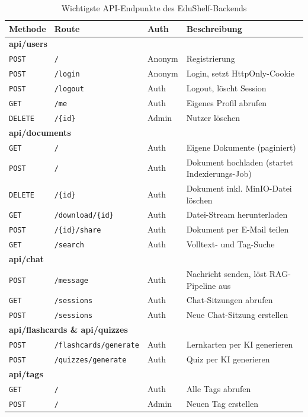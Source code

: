 \begin{table}[H]
\centering
\begin{tabular}{|l|p{5.5cm}|l|p{4cm}|}
\hline
\textbf{Methode} & \textbf{Route} & \textbf{Auth} & \textbf{Beschreibung} \\
\hline
\multicolumn{4}{|l|}{\textbf{api/users}} \\
\hline
\texttt{POST}   & \texttt{/}              & Anonym & Registrierung \\
\texttt{POST}   & \texttt{/login}         & Anonym & Login, setzt HttpOnly-Cookie \\
\texttt{POST}   & \texttt{/logout}        & Auth   & Logout, l\"oscht Session \\
\texttt{GET}    & \texttt{/me}            & Auth   & Eigenes Profil abrufen \\
\texttt{DELETE} & \texttt{/\{id\}}        & Admin  & Nutzer l\"oschen \\
\hline
\multicolumn{4}{|l|}{\textbf{api/documents}} \\
\hline
\texttt{GET}    & \texttt{/}              & Auth   & Eigene Dokumente (paginiert) \\
\texttt{POST}   & \texttt{/}              & Auth   & Dokument hochladen (startet Indexierungs-Job) \\
\texttt{DELETE} & \texttt{/\{id\}}        & Auth   & Dokument inkl. MinIO-Datei l\"oschen \\
\texttt{GET}    & \texttt{/download/\{id\}} & Auth & Datei-Stream herunterladen \\
\texttt{POST}   & \texttt{/\{id\}/share}  & Auth   & Dokument per E-Mail teilen \\
\texttt{GET}    & \texttt{/search}        & Auth   & Volltext- und Tag-Suche \\
\hline
\multicolumn{4}{|l|}{\textbf{api/chat}} \\
\hline
\texttt{POST}   & \texttt{/message}       & Auth   & Nachricht senden, l\"ost RAG-Pipeline aus \\
\texttt{GET}    & \texttt{/sessions}      & Auth   & Chat-Sitzungen abrufen \\
\texttt{POST}   & \texttt{/sessions}      & Auth   & Neue Chat-Sitzung erstellen \\
\hline
\multicolumn{4}{|l|}{\textbf{api/flashcards \& api/quizzes}} \\
\hline
\texttt{POST}   & \texttt{/flashcards/generate} & Auth & Lernkarten per KI generieren \\
\texttt{POST}   & \texttt{/quizzes/generate}    & Auth & Quiz per KI generieren \\
\hline
\multicolumn{4}{|l|}{\textbf{api/tags}} \\
\hline
\texttt{GET}    & \texttt{/}              & Auth   & Alle Tags abrufen \\
\texttt{POST}   & \texttt{/}              & Admin  & Neuen Tag erstellen \\
\hline
\end{tabular}
\caption{Wichtigste API-Endpunkte des EduShelf-Backends}
\label{tab:api_endpoints}
\end{table}
